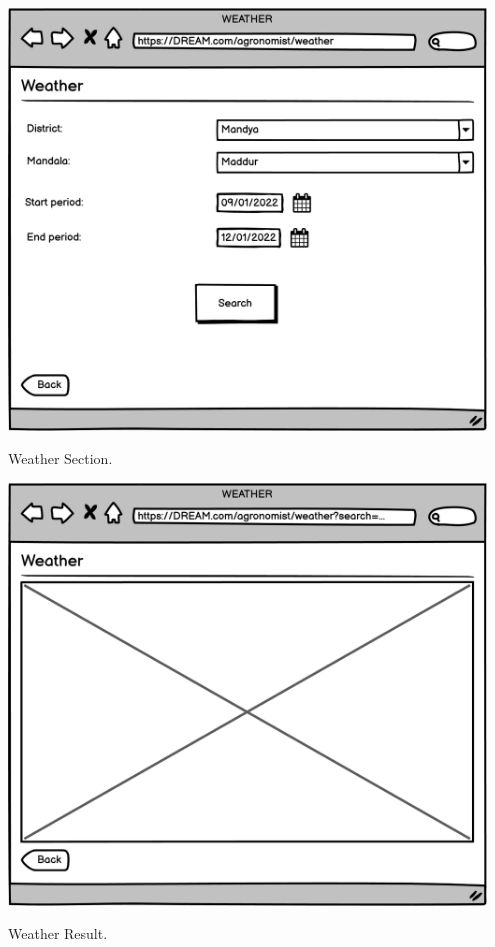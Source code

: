 \vspace{0.5cm}
\begin{minipage}{.5\textwidth}
	\centering
	\includegraphics[width=0.95\textwidth]{Images/Mockup/Agronomist/03AgronomistWeather.png}
	\captionsetup{type=figure}
	\caption{Weather Section.}
\end{minipage}%
\begin{minipage}{.5\textwidth}
	\centering
	\includegraphics[width=0.95\textwidth]{Images/Mockup/Agronomist/04AgronomistWeatherSearch.png}
	\captionsetup{type=figure}
	\caption{Weather Result.}
\end{minipage}
